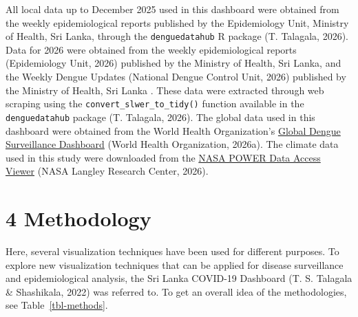\documentclass[
]{article}
\begin{document}
All local data up to December 2025 used in this dashboard were obtained
from the weekly epidemiological reports published by the Epidemiology
Unit, Ministry of Health, Sri Lanka, through the \texttt{denguedatahub}
R package (T. Talagala, 2026). Data for 2026 were obtained from the
weekly epidemiological reports (Epidemiology Unit, 2026) published by
the Ministry of Health, Sri Lanka, and the Weekly Dengue Updates
(National Dengue Control Unit, 2026) published by the Ministry of
Health, Sri Lanka . These data were extracted through web scraping using
the \texttt{convert\_slwer\_to\_tidy()} function available in the
\texttt{denguedatahub} package (T. Talagala, 2026). The global data used
in this dashboard were obtained from the World Health Organization's
\href{https://worldhealthorg.shinyapps.io/dengue_global/}{Global Dengue
Surveillance Dashboard} (World Health Organization, 2026a). The climate
data used in this study were downloaded from the
\href{https://power.larc.nasa.gov/data-access-viewer/}{NASA POWER Data
Access Viewer} (NASA Langley Research Center, 2026).

\section{4 Methodology}\label{methodology}

Here, several visualization techniques have been used for different
purposes. To explore new visualization techniques that can be applied
for disease surveillance and epidemiological analysis, the Sri Lanka
COVID-19 Dashboard (T. S. Talagala \& Shashikala, 2022) was referred to.
To get an overall idea of the methodologies, see
Table~\ref{tbl-methods}.
\end{document}
